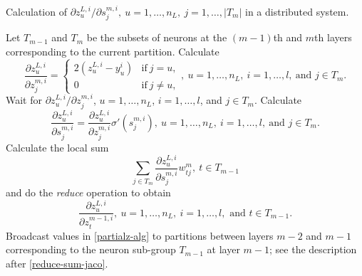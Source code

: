 \documentclass[12pt]{article}
\renewcommand{\baselinestretch}{2}
\begin{document}
\begin{algorithm}[t]
  \caption{Calculation of $\partial z^{L,i}_u/\partial s^{m,i}_j,\ u=1,\ldots,n_L,\ j=1,\ldots,|T_m|$ in a distributed system.}
  \begin{algorithmic}[1]
		\State Let $T_{m-1}$ and $T_m$ be the subsets of neurons at the $(m-1)$th and $m$th layers corresponding to the current partition.
			\State Calculate
			\begin{equation*}
			\frac{\partial z^{L,i}_u}{\partial z^{m,i}_j} =
			\begin{cases}
				2(z^{L,i}_u-y^i_u) &\text{if}\ j = u,\\
				0 &\text{if}\ j \neq u,
			\end{cases} 
			,\ u=1,\ldots,n_L,\ i=1,\ldots,l,\ \text{and } j \in T_m.
			\end{equation*}
		\Else
			\State Wait for $\partial z^{L,i}_u/\partial z^{m,i}_j$, $u=1,\ldots,n_L$, $i=1,\ldots,l$, and $j \in T_m$.
		\EndIf
		\State Calculate
		\begin{equation}
    		\label{pzps-alg}
			\frac{\partial z^{L,i}_u}{\partial s^{m,i}_j} = \frac{\partial z^{L,i}_u}{\partial z^{m,i}_j} \sigma' (s_j^{m,i}),\ 
			u=1,\ldots,n_L,\ i=1,\ldots,l,\ \text{and } j \in T_m.
		\end{equation}
			\State Calculate the local sum
        \begin{equation}
          \label{jaco-local-sum-alg}
          \sum_{j \in T_m} \frac{\partial z^{L,i}_u}{\partial s^{m,i}_j} w^m_{tj},\ t \in T_{m-1}
        \end{equation}
        \Statex \indent \indent \hspace{-1.2ex} and do the {\it reduce} operation to obtain
			\begin{equation}
			\label{partialz-alg} 
				\frac{\partial z^{L,i}_u}{\partial z^{m-1,i}_t},\ u=1,\ldots,n_L,\ i=1,\ldots,l, \text{ and } t \in T_{m-1}.
			\end{equation}
				\State Broadcast values in \eqref{partialz-alg} to partitions between layers $m-2$ and $m-1$ 
                \Statex \indent \indent \hspace{2ex} corresponding to the neuron sub-group $T_{m-1}$ at layer $m-1$; 
                \Statex \indent \indent \hspace{2ex} see the description after \eqref{reduce-sum-jaco}.
			\EndIf
		\EndIf
  \end{algorithmic}
  \label{alg:jaco}
\end{algorithm}
\renewcommand{\baselinestretch}{2}
\end{document}
